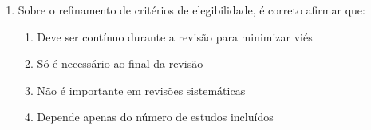 \documentclass[12pt,a4paper]{article}
\begin{document}
\begin{enumerate}
\item Sobre o refinamento de critérios de elegibilidade, é correto afirmar que:
\begin{enumerate}
    \item Deve ser contínuo durante a revisão para minimizar viés
    \item Só é necessário ao final da revisão
    \item Não é importante em revisões sistemáticas
    \item Depende apenas do número de estudos incluídos
\end{enumerate}

\end{enumerate}
\end{document}
